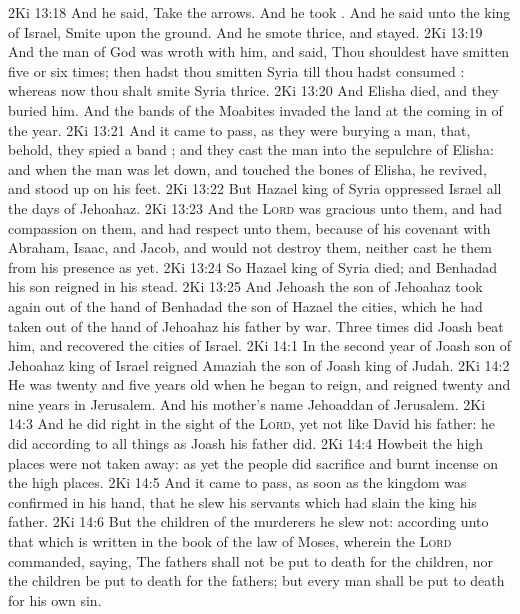 \vs 2Ki 13:18 And he said, Take the arrows. And he took . And he said unto the king of Israel, Smite upon the ground. And he smote thrice, and stayed.
\vs 2Ki 13:19 And the man of God was wroth with him, and said, Thou shouldest have smitten five or six times; then hadst thou smitten Syria till thou hadst consumed : whereas now thou shalt smite Syria  thrice.
\vs 2Ki 13:20 And Elisha died, and they buried him. And the bands of the Moabites invaded the land at the coming in of the year.
\vs 2Ki 13:21 And it came to pass, as they were burying a man, that, behold, they spied a band ; and they cast the man into the sepulchre of Elisha: and when the man was let down, and touched the bones of Elisha, he revived, and stood up on his feet.
\vs 2Ki 13:22 But Hazael king of Syria oppressed Israel all the days of Jehoahaz.
\vs 2Ki 13:23 And the \textsc{Lord} was gracious unto them, and had compassion on them, and had respect unto them, because of his covenant with Abraham, Isaac, and Jacob, and would not destroy them, neither cast he them from his presence as yet.
\vs 2Ki 13:24 So Hazael king of Syria died; and Benhadad his son reigned in his stead.
\vs 2Ki 13:25 And Jehoash the son of Jehoahaz took again out of the hand of Benhadad the son of Hazael the cities, which he had taken out of the hand of Jehoahaz his father by war. Three times did Joash beat him, and recovered the cities of Israel.
\vs 2Ki 14:1 In the second year of Joash son of Jehoahaz king of Israel reigned Amaziah the son of Joash king of Judah.
\vs 2Ki 14:2 He was twenty and five years old when he began to reign, and reigned twenty and nine years in Jerusalem. And his mother's name  Jehoaddan of Jerusalem.
\vs 2Ki 14:3 And he did  right in the sight of the \textsc{Lord}, yet not like David his father: he did according to all things as Joash his father did.
\vs 2Ki 14:4 Howbeit the high places were not taken away: as yet the people did sacrifice and burnt incense on the high places.
\vs 2Ki 14:5 And it came to pass, as soon as the kingdom was confirmed in his hand, that he slew his servants which had slain the king his father.
\vs 2Ki 14:6 But the children of the murderers he slew not: according unto that which is written in the book of the law of Moses, wherein the \textsc{Lord} commanded, saying, The fathers shall not be put to death for the children, nor the children be put to death for the fathers; but every man shall be put to death for his own sin.
